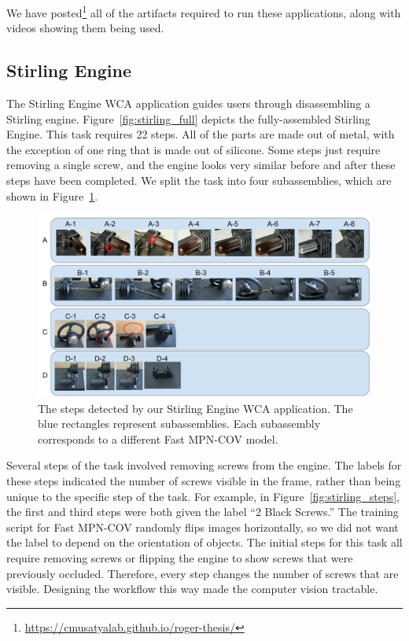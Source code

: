 We have posted\footnote{\url{https://cmusatyalab.github.io/roger-thesis/}} all
of the
artifacts required to run these applications, along with videos showing them
being used.

\subsection{Stirling Engine}\label{sec:stirling}

The Stirling Engine WCA application guides users through disassembling a
Stirling engine.
Figure~\ref{fig:stirling_full} depicts the fully-assembled Stirling Engine.
This task requires 22 steps. All of the parts are made out of
metal, with the exception of one ring that is made out of silicone. Some steps
just require removing a single screw, and the engine looks very similar before
and after these steps have been completed.
We split the task into four subassemblies, which are shown in
Figure~\ref{fig:stirling_subs}.

\begin{figure}
  \includegraphics[width=\columnwidth]{figures/stirling_subassemblies.pdf}
  \caption{
    The steps detected by our Stirling Engine WCA application.
    The blue rectangles represent subassemblies.
    Each subassembly corresponds to a different Fast MPN-COV model.
  }\label{fig:stirling_subs}
\end{figure}

Several steps of the task involved removing screws from the engine.
The labels for these steps indicated the number of screws visible in the frame,
rather than being unique to the specific step of the task.
For example, in Figure~\ref{fig:stirling_steps}, the first and third steps
were both given the label ``2 Black Screws.''
The training script for Fast MPN-COV randomly flips images
horizontally, so we did not want the label to depend on the orientation of
objects.
The initial steps for this task all require removing screws or flipping the
engine to show screws that were previously occluded.
Therefore, every step changes the number of screws that are visible.
Designing the workflow this way made the computer vision tractable.

